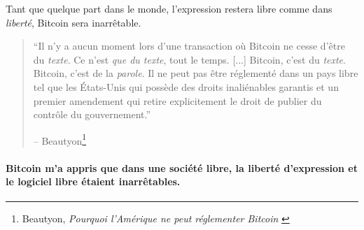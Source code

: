 Tant que quelque part dans le monde, l'expression restera libre comme dans
\textit{liberté}, Bitcoin sera inarrêtable.

\begin{quotation}\begin{samepage}
\enquote{Il n'y a aucun moment lors d'une transaction où Bitcoin ne cesse d'être
du \textit{texte}. Ce n'est \textit{que du texte}, tout le temps. [...] Bitcoin,
c'est du \textit{texte}. Bitcoin, c'est de la \textit{parole}. Il ne peut pas
être réglementé dans un pays libre tel que les États-Unis qui possède des droits
inaliénables garantis et un premier amendement qui retire explicitement le droit
de publier du contrôle du gouvernement.}
\begin{flushright} -- Beautyon\footnote{Beautyon, \textit{Pourquoi l'Amérique ne
peut réglementer Bitcoin} \cite{america-regulate-bitcoin}}
\end{flushright}\end{samepage}\end{quotation}

\paragraph{Bitcoin m'a appris que dans une société libre, la liberté
d'expression et le logiciel libre étaient inarrêtables.}

%
%
%
%
%
%
%
